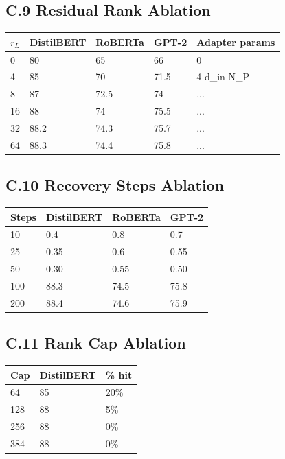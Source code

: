 \subsection{C.9 Residual Rank Ablation}

\begin{table}[H]
\centering
\small
\begin{tabular}{lllll}
\toprule
\textbf{$r_L$} & \textbf{DistilBERT} & \textbf{RoBERTa} & \textbf{GPT-2} & \textbf{Adapter params} \\
\midrule
0 & 80 & 65 & 66 & 0 \\
4 & 85 & 70 & 71.5 & 4 d\_in N\_P \\
8 & 87 & 72.5 & 74 & ... \\
16 & 88 & 74 & 75.5 & ... \\
32 & 88.2 & 74.3 & 75.7 & ... \\
64 & 88.3 & 74.4 & 75.8 & ... \\
\bottomrule
\end{tabular}
\end{table}

\subsection{C.10 Recovery Steps Ablation}

\begin{table}[H]
\centering
\small
\begin{tabular}{llll}
\toprule
\textbf{Steps} & \textbf{DistilBERT} & \textbf{RoBERTa} & \textbf{GPT-2} \\
\midrule
10 & 0.4 & 0.8 & 0.7 \\
25 & 0.35 & 0.6 & 0.55 \\
50 & 0.30 & 0.55 & 0.50 \\
100 & 88.3 & 74.5 & 75.8 \\
200 & 88.4 & 74.6 & 75.9 \\
\bottomrule
\end{tabular}
\end{table}

\subsection{C.11 Rank Cap Ablation}

\begin{table}[H]
\centering
\small
\begin{tabular}{lll}
\toprule
\textbf{Cap} & \textbf{DistilBERT} & \textbf{\% hit} \\
\midrule
64 & 85 & 20\% \\
128 & 88 & 5\% \\
256 & 88 & 0\% \\
384 & 88 & 0\% \\
\bottomrule
\end{tabular}
\end{table}

